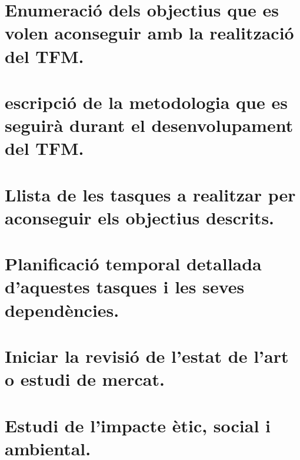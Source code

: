 \documentclass{article}
\begin{document}
\section{Enumeració dels objectius que es volen aconseguir amb la realització del TFM.}
\section{escripció de la metodologia que es seguirà durant el desenvolupament del TFM.}
\section{Llista de les tasques a realitzar per aconseguir els objectius descrits.}
\section{Planificació temporal detallada d'aquestes tasques i les seves dependències.}
\section{Iniciar la revisió de l'estat de l'art o estudi de mercat.}
\section{Estudi de l'impacte ètic, social i ambiental.} 
\end{document}
